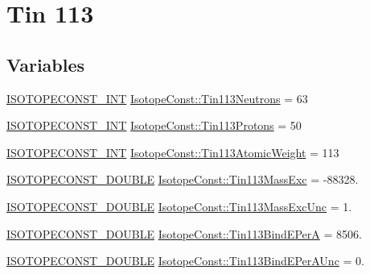 \hypertarget{group___isotope_const-_tin-_sn113}{}\section{Tin 113}
\label{group___isotope_const-_tin-_sn113}
\subsection*{Variables}
\begin{DoxyCompactItemize}
\item 
\mbox{\hyperlink{group___isotope_const-_macros_ga5f18360b3e99483a35c32d789e62621c}{I\+S\+O\+T\+O\+P\+E\+C\+O\+N\+S\+T\+\_\+\+I\+NT}} \mbox{\hyperlink{group___isotope_const-_tin-_sn113_ga5a098874289d166ca5135c932a255433}{Isotope\+Const\+::\+Tin113\+Neutrons}} = 63
\item 
\mbox{\hyperlink{group___isotope_const-_macros_ga5f18360b3e99483a35c32d789e62621c}{I\+S\+O\+T\+O\+P\+E\+C\+O\+N\+S\+T\+\_\+\+I\+NT}} \mbox{\hyperlink{group___isotope_const-_tin-_sn113_gac343d76f289bd487f7be54d6e1dfdfb3}{Isotope\+Const\+::\+Tin113\+Protons}} = 50
\item 
\mbox{\hyperlink{group___isotope_const-_macros_ga5f18360b3e99483a35c32d789e62621c}{I\+S\+O\+T\+O\+P\+E\+C\+O\+N\+S\+T\+\_\+\+I\+NT}} \mbox{\hyperlink{group___isotope_const-_tin-_sn113_ga3fa8859eecbed681b8bd724b4032d731}{Isotope\+Const\+::\+Tin113\+Atomic\+Weight}} = 113
\item 
\mbox{\hyperlink{group___isotope_const-_macros_ga8f45a7272ce02c0b4c65c44636ed719a}{I\+S\+O\+T\+O\+P\+E\+C\+O\+N\+S\+T\+\_\+\+D\+O\+U\+B\+LE}} \mbox{\hyperlink{group___isotope_const-_tin-_sn113_ga901993f05450f641e8e24a607eec07ba}{Isotope\+Const\+::\+Tin113\+Mass\+Exc}} = -\/88328.
\item 
\mbox{\hyperlink{group___isotope_const-_macros_ga8f45a7272ce02c0b4c65c44636ed719a}{I\+S\+O\+T\+O\+P\+E\+C\+O\+N\+S\+T\+\_\+\+D\+O\+U\+B\+LE}} \mbox{\hyperlink{group___isotope_const-_tin-_sn113_ga270a04e0bb8c1e44e18b6e498f3bb14e}{Isotope\+Const\+::\+Tin113\+Mass\+Exc\+Unc}} = 1.
\item 
\mbox{\hyperlink{group___isotope_const-_macros_ga8f45a7272ce02c0b4c65c44636ed719a}{I\+S\+O\+T\+O\+P\+E\+C\+O\+N\+S\+T\+\_\+\+D\+O\+U\+B\+LE}} \mbox{\hyperlink{group___isotope_const-_tin-_sn113_gaa33e68d92b8bc9fd44a84cdb75eb656d}{Isotope\+Const\+::\+Tin113\+Bind\+E\+PerA}} = 8506.
\item 
\mbox{\hyperlink{group___isotope_const-_macros_ga8f45a7272ce02c0b4c65c44636ed719a}{I\+S\+O\+T\+O\+P\+E\+C\+O\+N\+S\+T\+\_\+\+D\+O\+U\+B\+LE}} \mbox{\hyperlink{group___isotope_const-_tin-_sn113_ga6bba9fced65f51022b07a6ec59fa9809}{Isotope\+Const\+::\+Tin113\+Bind\+E\+Per\+A\+Unc}} = 0.

\end{DoxyCompactItemize}
